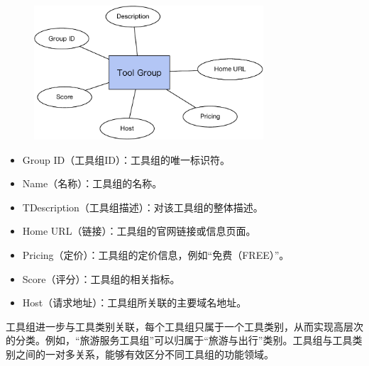 \begin{figure}[H]
    \vspace{1em}
    \centering
    \setlength{\abovecaptionskip}{10pt} %
    \includegraphics[height=5cm]{../assets/图谱格式-tool group.pdf}
    \label{fig:ch3-kg-tool-group}
  \end{figure}

\begin{itemize}
    \item Group ID（工具组ID）：工具组的唯一标识符。
    \item Name（名称）：工具组的名称。
    \item TDescription（工具组描述）：对该工具组的整体描述。
    \item Home URL（链接）：工具组的官网链接或信息页面。
    \item Pricing（定价）：工具组的定价信息，例如``免费（FREE）''。
    \item Score（评分）：工具组的相关指标。
    \item Host（请求地址）：工具组所关联的主要域名地址。
\end{itemize}

工具组进一步与工具类别关联，每个工具组只属于一个工具类别，从而实现高层次的分类。例如，“旅游服务工具组”可以归属于“旅游与出行”类别。工具组与工具类别之间的一对多关系，能够有效区分不同工具组的功能领域。

